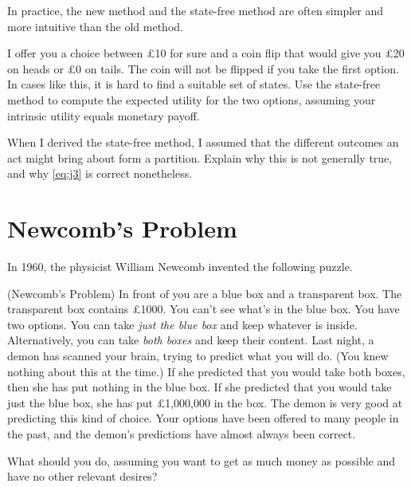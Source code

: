 In practice, the new method and the state-free method are often simpler and more
intuitive than the old method. 

\begin{exercise}{1}
  I offer you a choice between £10 for sure and a coin flip that would give you
  £20 on heads or £0 on tails. The coin will not be flipped if you take the
  first option. In cases like this, it is hard to find a suitable set of states.
  Use the state-free method to compute the expected utility for the two options,
  assuming your intrinsic utility equals monetary payoff.
\end{exercise}

\begin{exercise}{3}
  When I derived the state-free method, I assumed that the different outcomes an
  act might bring about form a partition. Explain why this is not generally
  true, and why \eqref{eq:j3} is correct nonetheless.
\end{exercise}


\section{Newcomb's Problem}

In 1960, the physicist William Newcomb invented the following puzzle.

\begin{example}(Newcomb's Problem) In front of you are a blue box and a
  transparent box. The transparent box contains £1000. You can't see what's in
  the blue box. You have two options. You can take \emph{just the blue box} and
  keep whatever is inside. Alternatively, you can take \emph{both boxes} and
  keep their content. Last night, a demon has scanned your brain, trying to
  predict what you will do. (You knew nothing about this at the time.) If she
  predicted that you would take both boxes, then she has put nothing in the blue
  box. If she predicted that you would take just the blue box, she has put
  £1,000,000 in the box. The demon is very good at predicting this kind of
  choice. Your options have been offered to many people in the past, and the
  demon's predictions have almost always been correct.
\end{example}
\noindent%
What should you do, assuming you want to get as much money as possible and have
no other relevant desires?

